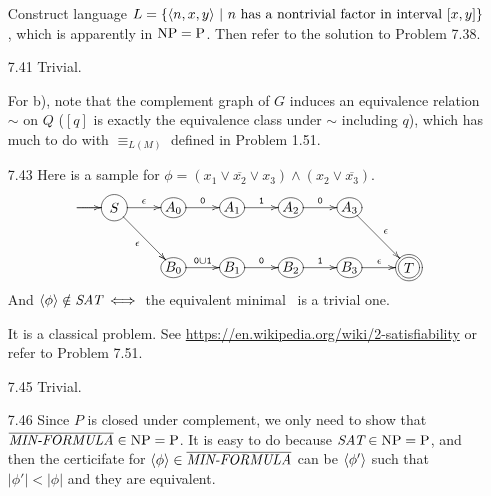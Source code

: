 \begin{itemize}
	\item[\Star 7.39]
	Construct language $L = \{ \Bra{n, x, y} \ | \ \text{$n$ has a nontrivial factor in interval $[x, y]$} \}$, which is apparently in $\NPoly = \Poly$. Then refer to the solution to Problem 7.38.
	
	\item[\Star 7.40] 
	\Omit
	
	\item[7.41]
	Trivial.
	
	\item[\Star 7.42]
	For b), note that the complement graph of $G$ induces an equivalence relation $\sim$ on $Q$ ($[q]$ is exactly the equivalence class under $\sim$ including $q$), which has much to do with $\equiv_{L(M)}$ defined in Problem 1.51.
	
	\item[7.43]
	Here is a sample for $\phi = (x_1 \vee \overline{x_2} \vee x_3) \wedge (x_2 \vee \overline{x_3})$.
	$$
	\xymatrix@R=2pc@C=2pc{
		*+<1pc>[o][F-]{S} \ar@(l,l)[]^{} \ar[r]^{\epsilon} \ar[rd]_{\epsilon} & 
		*+[o][F-]{A_0} \ar[r]^{\TT{0}} & 
		*+[o][F-]{A_1} \ar[r]^{\TT{1}} & 
		*+[o][F-]{A_2} \ar[r]^{\TT{0}} &
		*+[o][F-]{A_3} \ar[rd]^{\epsilon} \\ & 
		*+[o][F-]{B_0} \ar[r]^{\TT{0} \cup \TT{1}} & 
		*+[o][F-]{B_1} \ar[r]^{\TT{0}} & 
		*+[o][F-]{B_2} \ar[r]^{\TT{1}} &
		*+[o][F-]{B_3} \ar[r]^{\epsilon} &
		*+<1pc>[o][F=]{T}
	}
	$$
	And $\Bra{\phi} \notin \IT{SAT} \iff $ the equivalent minimal \NFA\ is a trivial one.
	
	\item[\Star 7.44]
	It is a classical problem. See \url{https://en.wikipedia.org/wiki/2-satisfiability} or refer to Problem 7.51.
	
	\item[7.45]
	Trivial.
	
	\item[7.46]
	Since $P$ is closed under complement, we only need to show that $\overline{\IT{MIN-FORMULA}} \in \NPoly = \Poly$. It is easy to do because $\IT{SAT} \in \NPoly = \Poly$, and then the certicifate for $\Bra{\phi} \in \overline{\IT{MIN-FORMULA}}$ can be $\Bra{\phi'}$ such that $|\phi'| < |\phi|$ and they are equivalent.
	

\end{itemize}
